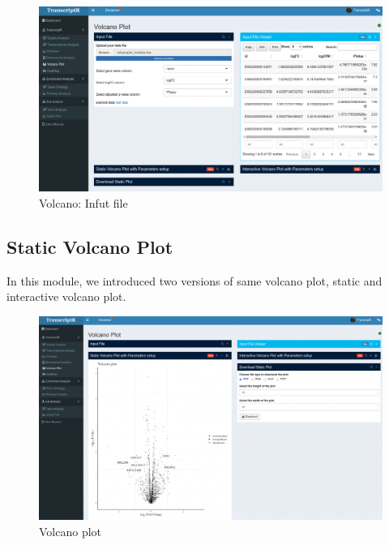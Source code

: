 \documentclass[
  a4paper,
  oneside,
  open=any]{scrreport}
\begin{document}
\begin{figure}[H]

{\centering \includegraphics{./images/volcano/volcano1.png}

}

\caption{\label{fig-vol1}Volcano: Infut file}

\end{figure}

\hypertarget{static-volcano-plot}{%
\subsection{Static Volcano Plot}\label{static-volcano-plot}}

In this module, we introduced two versions of same volcano plot, static
and interactive volcano plot.

\begin{figure}[H]

{\centering \includegraphics{./images/volcano/volcano2.png}

}

\caption{\label{fig-volstat}Volcano plot}

\end{figure}
\end{document}
